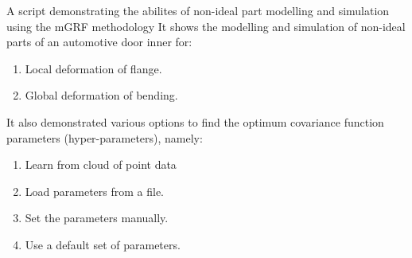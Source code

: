 \documentclass[a4paper,10pt,english]{sphinxmanual}
\begin{document}
\begin{fulllineitems}
\label{\detokenize{index:mGRF.mGRF_main}}
A script demonstrating the abilites of non-ideal part modelling and
simulation using the mGRF methodology
It shows the modelling and simulation of non-ideal parts of an automotive
door inner for:
\begin{enumerate}
%
\item {} 
Local deformation of flange.

\item {} 
Global deformation of bending.

\end{enumerate}

It also demonstrated various options to find the optimum covariance
function parameters (hyper-parameters), namely:
\begin{enumerate}
%
\item {} 
Learn from cloud of point data

\item {} 
Load parameters from a file.

\item {} 
Set the parameters manually.

\item {} 
Use a default set of parameters.

\end{enumerate}

\end{fulllineitems}

\end{document}

